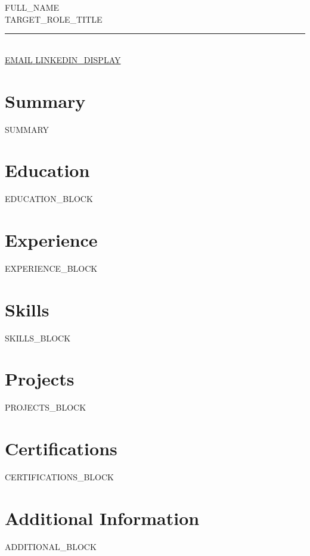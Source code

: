 \documentclass[a4paper,11pt]{article}
\begin{document}
\begin{center}
  {\Huge {{FULL_NAME}} }\\[6pt]
  {\large {{TARGET_ROLE_TITLE}} }\\[10pt]
  \rule{0.5\linewidth}{0.4pt}\\[10pt]
  {\small
    \href{mailto:{{EMAIL}}}{ {{EMAIL}} }  \quad
    \href{ {{LINKEDIN_URL}} }{ {{LINKEDIN_DISPLAY}} }
  }
\end{center}

\vspace{12pt}
\section*{Summary}
{{SUMMARY}}

\vspace{6pt}
\section*{Education}
{{EDUCATION_BLOCK}}

\vspace{6pt}
\section*{Experience}
{{EXPERIENCE_BLOCK}}

\vspace{6pt}
\section*{Skills}
{{SKILLS_BLOCK}}

\vspace{6pt}
\section*{Projects}
{{PROJECTS_BLOCK}}

\vspace{6pt}
\section*{Certifications}
{{CERTIFICATIONS_BLOCK}}

\vspace{6pt}
\section*{Additional Information}
{{ADDITIONAL_BLOCK}}
\end{document}
